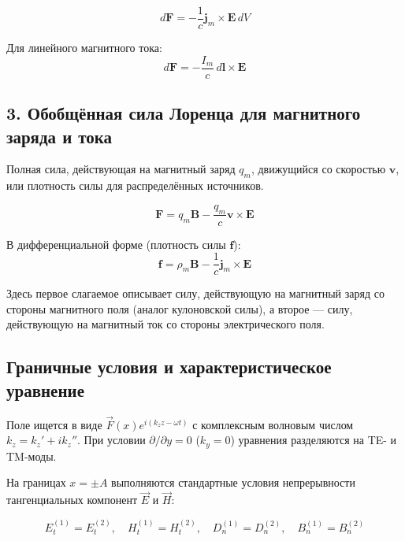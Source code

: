 \documentclass[a4paper,12pt]{article}
\begin{document}
\begin{equation}
    d\mathbf{F} = -\frac{1}{c} \mathbf{j}_m \times \mathbf{E} \, dV
    \label{eq:ampere_magnetic_density}
\end{equation}

Для линейного магнитного тока:
\begin{equation}
    d\mathbf{F} = -\frac{I_m}{c} \, d\mathbf{l} \times \mathbf{E}
    \label{eq:ampere_magnetic_linear}
\end{equation}

\subsection*{3. Обобщённая сила Лоренца для магнитного заряда и тока}
Полная сила, действующая на магнитный заряд $q_m$, движущийся со скоростью $\mathbf{v}$, или плотность силы для распределённых источников.

\begin{equation}
    \mathbf{F} = q_m \mathbf{B} - \frac{q_m}{c} \mathbf{v} \times \mathbf{E}
    \label{eq:lorentz_magnetic_point}
\end{equation}

В дифференциальной форме (плотность силы $\mathbf{f}$):
\begin{equation}
    \mathbf{f} = \rho_m \mathbf{B} - \frac{1}{c} \mathbf{j}_m \times \mathbf{E}
    \label{eq:lorentz_magnetic_density}
\end{equation}

\noindent Здесь первое слагаемое описывает силу, действующую на магнитный заряд со стороны магнитного поля (аналог кулоновской силы), а второе --- силу, действующую на магнитный ток со стороны электрического поля.

\subsection{Граничные условия и характеристическое уравнение}

Поле ищется в виде $\vec{F}(x) e^{i(k_z z - \omega t)}$ с комплексным
волновым числом $k_z = k_z' + i k_z''$. При условии $\partial/\partial y = 0$
($k_y = 0$) уравнения разделяются на TE- и TM-моды.

На границах $x = \pm A$ выполняются стандартные условия непрерывности
тангенциальных компонент $\vec{E}$ и $\vec{H}$:

\begin{equation}
E_{t}^{(1)} = E_{t}^{(2)}, \quad H_{t}^{(1)} = H_{t}^{(2)}, \quad
D_{n}^{(1)} = D_{n}^{(2)}, \quad B_{n}^{(1)} = B_{n}^{(2)}
\label{eq:boundary_conditions}
\end{equation}
\end{document}
